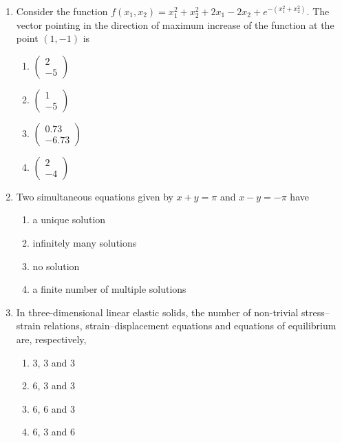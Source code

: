 \documentclass{article}
\begin{document}
\begin{enumerate}
\item Consider the function $f(x_1,x_2)=x_1^2+x_2^2+2x_1-2x_2+e^{-(x_1^2+x_2^2)}$. The vector pointing in the direction of maximum increase of the function at the point $(1,-1)$ is
\begin{multicols}{4}
\begin{enumerate}
\item $\begin{pmatrix}2\\-5\end{pmatrix}$
\item $\begin{pmatrix}1\\-5\end{pmatrix}$
\item $\begin{pmatrix}0.73\\-6.73\end{pmatrix}$
\item $\begin{pmatrix}2\\-4\end{pmatrix}$
\end{enumerate}
\end{multicols}

\item Two simultaneous equations given by $x+y=\pi$ and $x-y=-\pi$ have
\begin{multicols}{2}
\begin{enumerate}
\item a unique solution
\item infinitely many solutions
\item no solution
\item a finite number of multiple solutions
\end{enumerate}
\end{multicols}

\item In three-dimensional linear elastic solids, the number of non-trivial stress–strain relations, strain–displacement equations and equations of equilibrium are, respectively,
\begin{multicols}{4}
\begin{enumerate}
\item 3, 3 and 3
\item 6, 3 and 3
\item 6, 6 and 3
\item 6, 3 and 6
\end{enumerate}
\end{multicols}


\end{enumerate}
\end{document}
